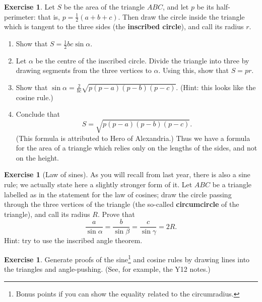 \documentclass[a4paper,leqno]{article}
\newcommand{\marginsymbol}{\marginpar{\hfill(\ding{43})}}
\numberwithin{equation}{section}
\theoremstyle{definition}
\newtheorem{exercise}[equation]{Exercise}
\theoremstyle{remark}
\newcommand{\df}[1]{\textbf{#1}}
\begin{document}
\begin{exercise}
  Let $ S $ be the area of the triangle $ ABC $, and let $ p $ be its half-perimeter: that is, $ p = \frac{1}{2}(a + b + c) $. Then draw
  the circle inside the triangle which is tangent to the three sides (the \df{inscribed circle}), and call its radius $ r $.
  \begin{enumerate}
    \item Show that $ S = \frac{1}{2} bc \sin \alpha $.
    \item Let $ \alpha $ be the centre of the inscribed circle. Divide the triangle into three by drawing segments
          from the three vertices to $ \alpha $. Using this, show that $ S = pr $.
    \item Show that $ \sin \alpha = \frac{2}{bc}\sqrt{p(p-a)(p-b)(p-c)} $. (Hint: this looks like the cosine rule.)
    \item Conclude that
          \begin{displaymath}
            S = \sqrt{p(p-a)(p-b)(p-c)}.
          \end{displaymath}
          (This formula is attributed to Hero of Alexandria.) Thus we have a formula for the area of a triangle which
          relies only on the lengths of the sides, and not on the height.
  \end{enumerate}
\end{exercise}

\begin{exercise}[Law of sines]
  As \marginsymbol you will recall from last year, there is also a sine rule; we actually state here a slightly stronger
  form of it. Let $ ABC $ be a triangle labelled as in the statement for the law of cosines; draw the circle passing
  through the three vertices of the triangle (the so-called \df{circumcircle} of the triangle), and call its
  radius $ R $. Prove that
  \begin{displaymath}
    \frac{a}{\sin \alpha} = \frac{b}{\sin \beta} = \frac{c}{\sin \gamma} = 2R.
  \end{displaymath}
  Hint: try to use the inscribed angle theorem.
\end{exercise}

\begin{exercise}
  Generate proofs of the sine\footnote{Bonus points if you can show the equality related to the circumradius.} and cosine rules by drawing lines into the
  triangles and angle-pushing. (See, for example, the Y12 notes.)
\end{exercise}
\end{document}
